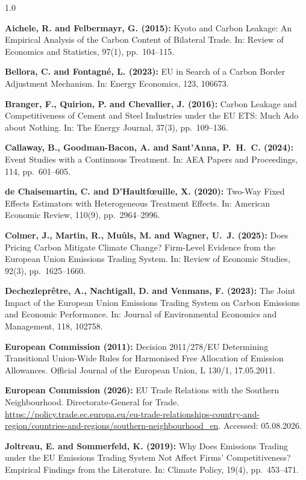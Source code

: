 \documentclass[12pt,a4paper]{article}
\begin{document}
\begin{spacing}{1.0}

\textbf{Aichele, R. and Felbermayr, G. (2015):} Kyoto and Carbon Leakage: An Empirical Analysis of the Carbon Content of Bilateral Trade. In: Review of Economics and Statistics, 97(1), pp.\ 104--115.

\textbf{Bellora, C. and Fontagn\'{e}, L. (2023):} EU in Search of a Carbon Border Adjustment Mechanism. In: Energy Economics, 123, 106673.

\textbf{Branger, F., Quirion, P. and Chevallier, J. (2016):} Carbon Leakage and Competitiveness of Cement and Steel Industries under the EU ETS: Much Ado about Nothing. In: The Energy Journal, 37(3), pp.\ 109--136.

\textbf{Callaway, B., Goodman-Bacon, A. and Sant'Anna, P.\ H.\ C. (2024):} Event Studies with a Continuous Treatment. In: AEA Papers and Proceedings, 114, pp.\ 601--605.

\textbf{de Chaisemartin, C. and D'Haultf\oe uille, X. (2020):} Two-Way Fixed Effects Estimators with Heterogeneous Treatment Effects. In: American Economic Review, 110(9), pp.\ 2964--2996.

\textbf{Colmer, J., Martin, R., Mu\^{u}ls, M. and Wagner, U.\ J. (2025):} Does Pricing Carbon Mitigate Climate Change? Firm-Level Evidence from the European Union Emissions Trading System. In: Review of Economic Studies, 92(3), pp.\ 1625--1660.

\textbf{Dechezlepr\^{e}tre, A., Nachtigall, D. and Venmans, F. (2023):} The Joint Impact of the European Union Emissions Trading System on Carbon Emissions and Economic Performance. In: Journal of Environmental Economics and Management, 118, 102758.

\textbf{European Commission (2011):} Decision 2011/278/EU Determining Transitional Union-Wide Rules for Harmonised Free Allocation of Emission Allowances. Official Journal of the European Union, L 130/1, 17.05.2011.

\textbf{European Commission (2026):} EU Trade Relations with the Southern Neighbourhood. Directorate-General for Trade. \url{https://policy.trade.ec.europa.eu/eu-trade-relationships-country-and-region/countries-and-regions/southern-neighbourhood_en}. Accessed: 05.08.2026.

\textbf{Joltreau, E. and Sommerfeld, K. (2019):} Why Does Emissions Trading under the EU Emissions Trading System Not Affect Firms' Competitiveness? Empirical Findings from the Literature. In: Climate Policy, 19(4), pp.\ 453--471.


\end{spacing}
\end{document}
